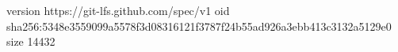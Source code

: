 version https://git-lfs.github.com/spec/v1
oid sha256:5348e3559099a5578f3d08316121f3787f24b55ad926a3ebb413c3132a5129e0
size 14432

